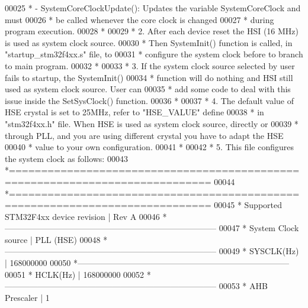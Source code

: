 \begin{DoxyCode}
00025 \textcolor{comment}{  *      - SystemCoreClockUpdate(): Updates the variable SystemCoreClock and must}
00026 \textcolor{comment}{  *                                 be called whenever the core clock is changed}
00027 \textcolor{comment}{  *                                 during program execution.}
00028 \textcolor{comment}{  *}
00029 \textcolor{comment}{  * 2. After each device reset the HSI (16 MHz) is used as system clock source.}
00030 \textcolor{comment}{  *    Then SystemInit() function is called, in "startup\_stm32f4xx.s" file, to}
00031 \textcolor{comment}{  *    configure the system clock before to branch to main program.}
00032 \textcolor{comment}{  *}
00033 \textcolor{comment}{  * 3. If the system clock source selected by user fails to startup, the SystemInit()}
00034 \textcolor{comment}{  *    function will do nothing and HSI still used as system clock source. User can }
00035 \textcolor{comment}{  *    add some code to deal with this issue inside the SetSysClock() function.}
00036 \textcolor{comment}{  *}
00037 \textcolor{comment}{  * 4. The default value of HSE crystal is set to 25MHz, refer to "HSE\_VALUE" define}
00038 \textcolor{comment}{  *    in "stm32f4xx.h" file. When HSE is used as system clock source, directly or}
00039 \textcolor{comment}{  *    through PLL, and you are using different crystal you have to adapt the HSE}
00040 \textcolor{comment}{  *    value to your own configuration.}
00041 \textcolor{comment}{  *}
00042 \textcolor{comment}{  * 5. This file configures the system clock as follows:}
00043 \textcolor{comment}{  *=============================================================================}
00044 \textcolor{comment}{  *=============================================================================}
00045 \textcolor{comment}{  *        Supported STM32F4xx device revision    | Rev A}
00046 \textcolor{comment}{  *-----------------------------------------------------------------------------}
00047 \textcolor{comment}{  *        System Clock source                    | PLL (HSE)}
00048 \textcolor{comment}{  *-----------------------------------------------------------------------------}
00049 \textcolor{comment}{  *        SYSCLK(Hz)                             | 168000000}
00050 \textcolor{comment}{  *-----------------------------------------------------------------------------}
00051 \textcolor{comment}{  *        HCLK(Hz)                               | 168000000}
00052 \textcolor{comment}{  *-----------------------------------------------------------------------------}
00053 \textcolor{comment}{  *        AHB Prescaler                          | 1}

\end{DoxyCode}

